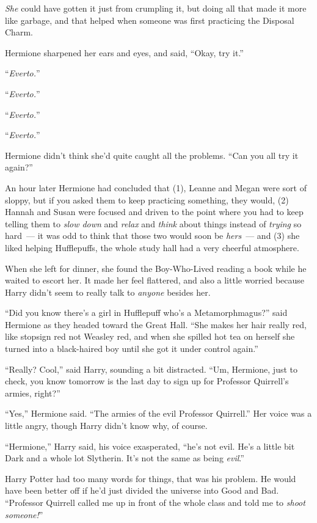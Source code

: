 \emph{She} could have gotten it just from crumpling it, but doing all that made it more like garbage, and that helped when someone was first practicing the Disposal Charm.

Hermione sharpened her ears and eyes, and said, ``Okay, try it.''

``\emph{Everto.}''

``\emph{Everto.}''

``\emph{Everto.}''

``\emph{Everto.}''

Hermione didn't think she'd quite caught all the problems. ``Can you all try it again?''

An hour later Hermione had concluded that (1), Leanne and Megan were sort of sloppy, but if you asked them to keep practicing something, they would, (2) Hannah and Susan were focused and driven to the point where you had to keep telling them to \emph{slow down} and \emph{relax} and \emph{think} about things instead of \emph{trying} so hard~--- it was odd to think that those two would soon be \emph{hers}~--- and (3) she liked helping Hufflepuffs, the whole study hall had a very cheerful atmosphere.

When she left for dinner, she found the Boy-Who-Lived reading a book while he waited to escort her. It made her feel flattered, and also a little worried because Harry didn't seem to really talk to \emph{anyone} besides her.

``Did you know there's a girl in Hufflepuff who's a Metamorphmagus?'' said Hermione as they headed toward the Great Hall. ``She makes her hair really red, like stopsign red not Weasley red, and when she spilled hot tea on herself she turned into a black-haired boy until she got it under control again.''

``Really? Cool,'' said Harry, sounding a bit distracted. ``Um, Hermione, just to check, you know tomorrow is the last day to sign up for Professor Quirrell's armies, right?''

``Yes,'' Hermione said. ``The armies of the evil Professor Quirrell.'' Her voice was a little angry, though Harry didn't know why, of course.

``Hermione,'' Harry said, his voice exasperated, ``he's not evil. He's a little bit Dark and a whole lot Slytherin. It's not the same as being \emph{evil}.''

Harry Potter had too many words for things, that was his problem. He would have been better off if he'd just divided the universe into Good and Bad. ``Professor Quirrell called me up in front of the whole class and told me to \emph{shoot someone!}''

